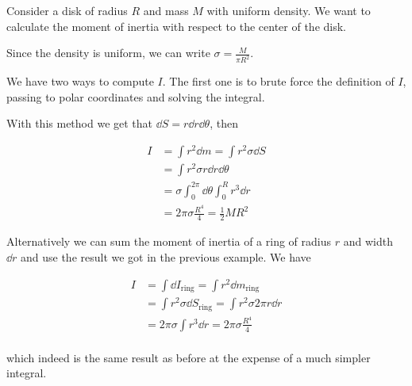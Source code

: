 \documentclass[12pt]{extarticle}
\begin{document}
\begin{example}
    Consider a disk of radius $R$ and mass $M$ with uniform density. We want to calculate the moment of inertia with respect to the center of the disk.

    Since the density is uniform, we can write $\sigma = \frac{M}{\pi R^2}$.

    We have two ways to compute $I$. The first one is to brute force the definition of $I$, passing to polar coordinates and solving the integral.

    With this method we get that $\dd{S} = r \dd{r} \dd{\theta}$, then

    \begin{align}
        I & = \int r^2 \dd{m} = \int r^2 \sigma \dd{S}             \\
          & = \int r^2 \sigma r \dd{r} \dd{\theta}                 \\
          & = \sigma \int_0^{2\pi} \dd{\theta} \int_0^R r^3 \dd{r} \\
          & = 2 \pi \sigma \frac{R^4}{4} = \frac{1}{2} M R^2
    \end{align}

    Alternatively we can sum the moment of inertia of a ring of radius $r$ and width $\dd{r}$ and use the result we got in the previous example.
    We have

    \begin{align}
        I & = \int \dd{I_\text{ring}} = \int r^2 \dd{m_\text{ring}}             \\
          & = \int r^2 \sigma \dd{S_\text{ring}}= \int r^2 \sigma 2\pi r \dd{r} \\
          & = 2\pi \sigma \int r^3 \dd{r} = 2\pi \sigma \frac{R^4}{4}           \\
    \end{align}

    which indeed is the same result as before at the expense of a much simpler integral.
\end{example}

\end{document}
